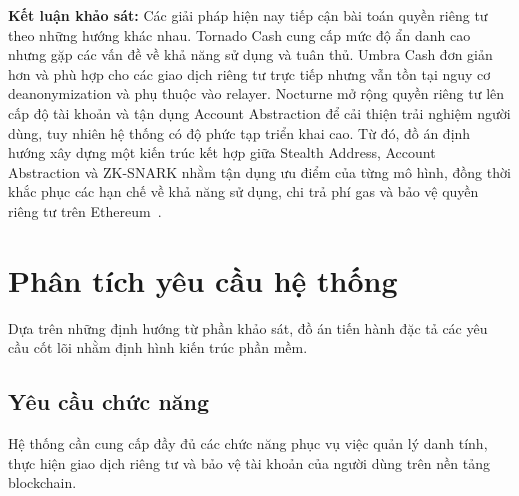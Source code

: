 \documentclass[../DoAn.tex]{subfiles}
\begin{document}
\textbf{Kết luận khảo sát:} Các giải pháp hiện nay tiếp cận bài toán quyền riêng tư theo những hướng khác nhau. Tornado Cash cung cấp mức độ ẩn danh cao nhưng gặp các vấn đề về khả năng sử dụng và tuân thủ. Umbra Cash đơn giản hơn và phù hợp cho các giao dịch riêng tư trực tiếp nhưng vẫn tồn tại nguy cơ deanonymization và phụ thuộc vào relayer. Nocturne mở rộng quyền riêng tư lên cấp độ tài khoản và tận dụng Account Abstraction để cải thiện trải nghiệm người dùng, tuy nhiên hệ thống có độ phức tạp triển khai cao. Từ đó, đồ án định hướng xây dựng một kiến trúc kết hợp giữa Stealth Address, Account Abstraction và ZK-SNARK nhằm tận dụng ưu điểm của từng mô hình, đồng thời khắc phục các hạn chế về khả năng sử dụng, chi trả phí gas và bảo vệ quyền riêng tư trên Ethereum~\cite{erc5564,erc4337,groth16}.

\section{Phân tích yêu cầu hệ thống}

Dựa trên những định hướng từ phần khảo sát, đồ án tiến hành đặc tả các yêu cầu cốt lõi nhằm định hình kiến trúc phần mềm.

\subsection{Yêu cầu chức năng}

Hệ thống cần cung cấp đầy đủ các chức năng phục vụ việc quản lý danh tính, thực hiện giao dịch riêng tư và bảo vệ tài khoản của người dùng trên nền tảng blockchain.
\end{document}
